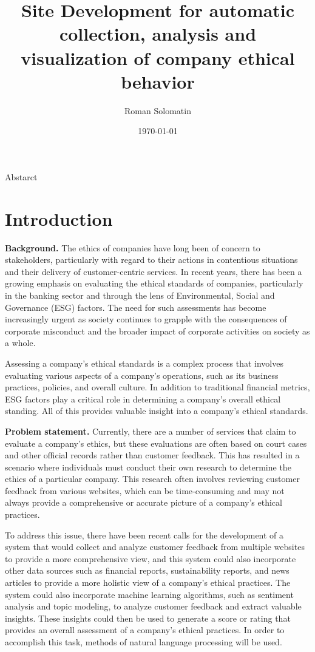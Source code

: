 \documentclass[PI]{ProjectProposal}
\author{Roman Solomatin}
\date{\today}
\title{Site Development for automatic collection, analysis and visualization of company ethical behavior}
\begin{document}
\maketitle
Abstarct

\chapter{Introduction}
\label{sec:org5dd22d3}
\textbf{Background.} The ethics of companies have long been of concern to stakeholders, particularly with regard to their actions in contentious situations and their delivery of customer-centric services. In recent years, there has been a growing emphasis on evaluating the ethical standards of companies, particularly in the banking sector and through the lens of Environmental, Social and Governance (ESG) factors\autocites{mure_esg_2021}[][]{miralles-quiros_esg_2019}[][]{climent_ethical_2018}. The need for such assessments has become increasingly urgent as society continues to grapple with the consequences of corporate misconduct and the broader impact of corporate activities on society as a whole.

Assessing a company's ethical standards is a complex process that involves evaluating various aspects of a company's operations, such as its business practices, policies, and overall culture. In addition to traditional financial metrics, ESG factors play a critical role in determining a company's overall ethical standing. All of this provides valuable insight into a company's ethical standards.

\textbf{Problem statement.} Currently, there are a number of services that claim to evaluate a company's ethics, but these evaluations are often based on court cases and other official records rather than customer feedback. This has resulted in a scenario where individuals must conduct their own research to determine the ethics of a particular company. This research often involves reviewing customer feedback from various websites, which can be time-consuming and may not always provide a comprehensive or accurate picture of a company's ethical practices.

To address this issue, there have been recent calls for the development of a system that would collect and analyze customer feedback from multiple websites to provide a more comprehensive view, and this system could also incorporate other data sources such as financial reports, sustainability reports, and news articles to provide a more holistic view of a company's ethical practices. The system could also incorporate machine learning algorithms, such as sentiment analysis and topic modeling, to analyze customer feedback and extract valuable insights. These insights could then be used to generate a score or rating that provides an overall assessment of a company's ethical practices. In order to accomplish this task, methods of natural language processing will be used.
\end{document}

